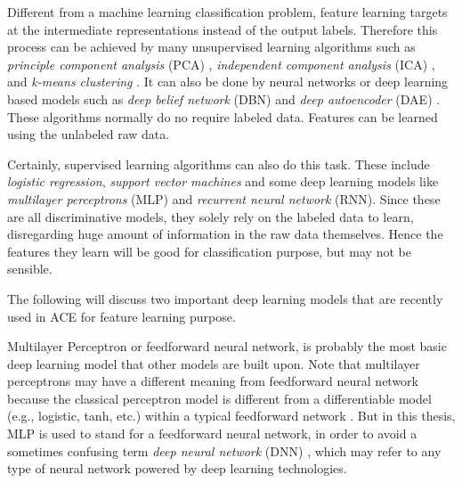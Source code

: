 Different from a machine learning classification problem, feature learning targets at the intermediate representations instead of the output labels. Therefore this process can be achieved by many unsupervised learning algorithms such as {\it principle component analysis} (PCA) \cite{jolliffe2002principal}, {\it independent component analysis} (ICA) \cite{hyvarinen2004independent}, and {\it k-means clustering} \cite{macqueen1967some}. It can also be done by neural networks or deep learning based models such as {\it deep belief network} (DBN) and {\it deep autoencoder} (DAE) \cite{bengio2009learning}. These algorithms normally do no require labeled data. Features can be learned using the unlabeled raw data.

Certainly, supervised learning algorithms can also do this task. These include {\it logistic regression}, {\it support vector machines} and some deep learning models like {\it multilayer perceptrons} (MLP) and {\it recurrent neural network} (RNN). Since these are all discriminative models, they solely rely on the labeled data to learn, disregarding huge amount of information in the raw data themselves. Hence the features they learn will be good for classification purpose, but may not be sensible.

The following will discuss two important deep learning models that are recently used in ACE for feature learning purpose.

Multilayer Perceptron or feedforward neural network, is probably the most basic deep learning model that other models are built upon. Note that multilayer perceptrons may have a different meaning from feedforward neural network because the classical perceptron model \cite{rosenblatt1958perceptron} is different from a differentiable model (e.g., logistic, tanh, etc.) within a typical feedforward network \cite{rumelhart1988parallel}. But in this thesis, MLP is used to stand for a feedforward neural network, in order to avoid a sometimes confusing term {\it deep neural network} (DNN) \cite{deng2014deep}, which may refer to any type of neural network powered by deep learning technologies.


